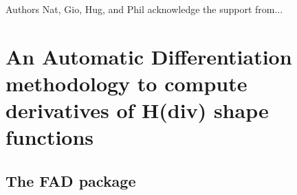 \documentclass[english,11pt,3p,number,sort&compress]{elsarticle}
\begin{document}
\bigskip{} Authors  Nat, Gio, Hug, and Phil acknowledge the support from...

\appendix

\section{An Automatic Differentiation methodology to compute derivatives of H(div) shape functions \label{sec:Appendix-A.-Derivation}}

\lipsum[1-1]

\subsection*{The FAD package}

\lipsum[1-1]

%
 

\end{document}
